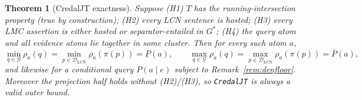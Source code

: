 \documentclass[11pt]{article}
\newtheorem{theorem}{Theorem}
\theoremstyle{definition}
\newcommand{\lo}{\underline}
\newcommand{\hi}{\overline}
\newcommand{\DLCN}{\mathcal{D}_{\mathrm{LCN}}}
\newcommand{\readoff}{\rho}
\begin{document}
\begin{theorem}[CredalJT exactness]\label{thm:d5}
Suppose \textup{(H1)} $T$ has the running-intersection property (true by construction);
\textup{(H2)} every LCN sentence is hosted; \textup{(H3)} every LMC assertion is either hosted or
separator-entailed in $G^\ast$; \textup{(H4)} the query atom and all evidence atoms lie together in
some cluster. Then for every such atom $a$,
\[
  \min_{q\in\mathcal G}\readoff_a(q)=\min_{p\in\DLCN}\readoff_a(\pi(p))=\lo P(a),
  \qquad
  \max_{q\in\mathcal G}\readoff_a(q)=\max_{p\in\DLCN}\readoff_a(\pi(p))=\hi P(a),
\]
and likewise for a conditional query $P(a\mid e)$ subject to Remark~\ref{rem:denfloor}. Moreover the
\emph{projection} half holds without \textup{(H2)}/\textup{(H3)}, so \texttt{CredalJT} is always a
valid \emph{outer} bound.
\end{theorem}
\end{document}

